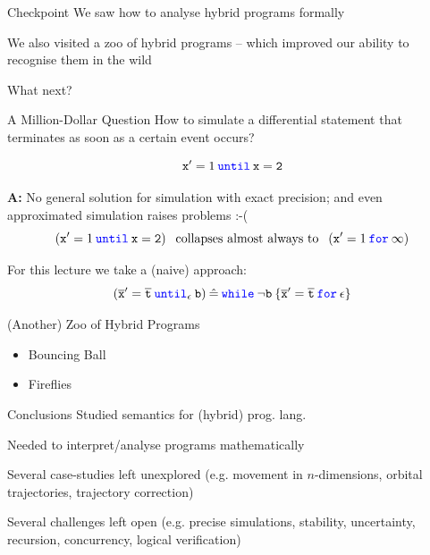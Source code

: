 \documentclass{beamer}
\newcommand{\blue}[1]{\textcolor{blue}{#1}}
\begin{document}
\begin{frame}{Checkpoint}
        We saw how to \alert{analyse} hybrid programs \alert{formally}

        We also visited a zoo of hybrid programs -- which improved our 
        ability to recognise them in the wild

        \pause
        What next?
\end{frame}


\begin{frame}{A Million-Dollar Question}
        How to simulate a differential statement that \alert{terminates
        as soon as} a certain \alert{event} occurs?  

        \[
                \mathtt{x}' = 1 \> \mathtt{\blue{until}} \> \mathtt{x = 2}
        \]

        \textbf{A:} No general solution for simulation with \alert{exact
        precision}; and even approximated simulation raises problems :-( 
        \[
                (\mathtt{x}' = 1 \> \mathtt{\blue{until}} \> \mathtt{x = 2}) \> \>
                \text{ collapses almost always to } \> \>
                (\mathtt{x}' = 1 \> \mathtt{\blue{for}} \> \mathtt{\infty})
        \]

        \vfill
        \pause
        For this lecture we take a (naive) approach:
        \[
                (\overline{\mathtt{x}}' = \overline{\mathtt{t}} \>
                \blue{\mathtt{until}}_\epsilon \> \mathtt{b}) \> \hat = \>
                \blue{\mathtt{while}} \> \neg \mathtt{b} \> \{ \overline{\mathtt{x}}' 
                = \overline{\mathtt{t}} \> \blue{\mathtt{for}} \> \epsilon \} 
        \]
        \end{frame}
\begin{frame}{(Another) Zoo of Hybrid Programs}
        \begin{itemize}
                \item Bouncing Ball
                \item Fireflies
        \end{itemize}

\end{frame}

\begin{frame}{Conclusions}
        Studied \alert{semantics} for (hybrid) prog. lang.

        Needed to interpret/analyse programs \alert{mathematically}

        Several case-studies left unexplored (e.g. movement in $n$-dimensions,
                orbital trajectories, trajectory correction)

        Several challenges left open (e.g. precise simulations, stability,
        uncertainty, recursion, concurrency, logical verification)
\end{frame}
\end{document}
